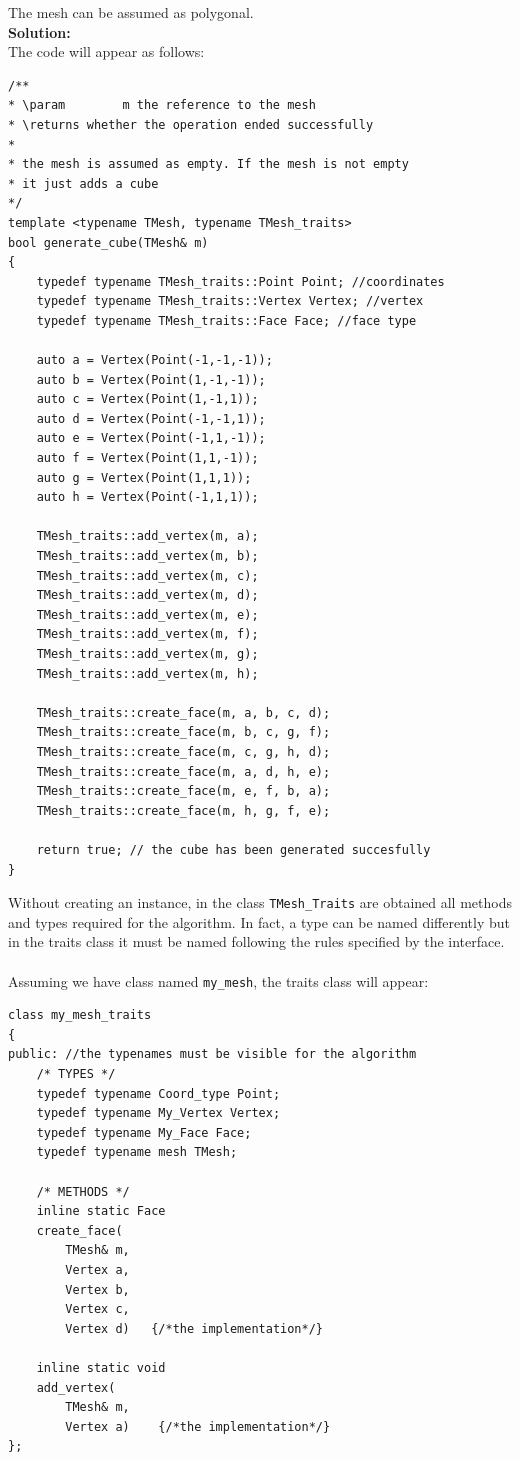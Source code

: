 The mesh can be assumed as polygonal.\\

\textbf{Solution:}\\
The code will appear as follows:


\begin{lstlisting}
/**
* \param		m the reference to the mesh
* \returns whether the operation ended successfully
*
* the mesh is assumed as empty. If the mesh is not empty
* it just adds a cube
*/
template <typename TMesh, typename TMesh_traits>
bool generate_cube(TMesh& m)
{
	typedef typename TMesh_traits::Point Point; //coordinates
	typedef typename TMesh_traits::Vertex Vertex; //vertex
	typedef typename TMesh_traits::Face Face; //face type
	
	auto a = Vertex(Point(-1,-1,-1));
	auto b = Vertex(Point(1,-1,-1));
	auto c = Vertex(Point(1,-1,1));
	auto d = Vertex(Point(-1,-1,1));
	auto e = Vertex(Point(-1,1,-1));
	auto f = Vertex(Point(1,1,-1));
	auto g = Vertex(Point(1,1,1));
	auto h = Vertex(Point(-1,1,1));
	
	TMesh_traits::add_vertex(m, a);
	TMesh_traits::add_vertex(m, b);
	TMesh_traits::add_vertex(m, c);
	TMesh_traits::add_vertex(m, d);
	TMesh_traits::add_vertex(m, e);
	TMesh_traits::add_vertex(m, f);
	TMesh_traits::add_vertex(m, g);
	TMesh_traits::add_vertex(m, h);

	TMesh_traits::create_face(m, a, b, c, d);
	TMesh_traits::create_face(m, b, c, g, f);
	TMesh_traits::create_face(m, c, g, h, d);
	TMesh_traits::create_face(m, a, d, h, e);		
	TMesh_traits::create_face(m, e, f, b, a);		
	TMesh_traits::create_face(m, h, g, f, e);
	
	return true; // the cube has been generated succesfully
}
\end{lstlisting}
\label{code:traits}
Without creating an instance, in the class \texttt{TMesh\_Traits} are obtained all
methods and types required for the algorithm. In fact, a type can be named
differently but in the traits class it must be named following the rules specified
by the interface.\\
\\
Assuming we have class named \texttt{my\_mesh}, the traits class will appear:
\begin{lstlisting}
class my_mesh_traits
{
public:	//the typenames must be visible for the algorithm
	/* TYPES */
	typedef typename Coord_type Point;
	typedef typename My_Vertex Vertex;
	typedef typename My_Face Face;
	typedef typename mesh TMesh;

	/* METHODS */
	inline static Face
	create_face(
		TMesh& m,
		Vertex a,
		Vertex b,
		Vertex c,
		Vertex d)	{/*the implementation*/}
	
	inline static void
	add_vertex(
		TMesh& m,
		Vertex a)	 {/*the implementation*/}
};
\end{lstlisting}